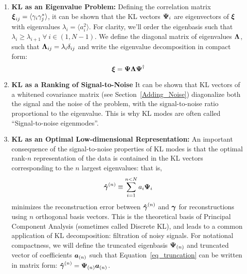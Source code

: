 \begin{enumerate}
\item \textbf{KL as an Eigenvalue Problem:} 
  Defining the correlation matrix 
  $\boldsymbol{\xi}_{ij} = \langle \gamma_i\gamma_j^*\rangle$, 
  it can be shown that the KL vectors $\boldsymbol{\Psi}_i$ are eigenvectors 
  of $\boldsymbol{\xi}$ with eigenvalues $\lambda_i = \langle a_i^2\rangle$.
  For clarity, we'll order the eigenbasis such that 
  $\lambda_i \ge \lambda_{i+1}\ \forall\ i\in(1,N-1)$.  We define the
  diagonal matrix of eigenvalues $\boldsymbol{\Lambda}$, such that
  $\boldsymbol{\Lambda}_{ij} = \lambda_i\delta_{ij}$
  and write the eigenvalue decomposition in compact form:
  \begin{equation}
    \boldsymbol{\xi} = \boldsymbol{\Psi}\boldsymbol{\Lambda}\boldsymbol{\Psi}^\dagger
  \end{equation}

\item \textbf{KL as a Ranking of Signal-to-Noise}
  It can be shown that KL vectors of a whitened covariance matrix (see
  Section~\ref{Adding_Noise})
  diagonalize both the signal and the noise of the problem, with the
  signal-to-noise ratio proportional to the eigenvalue.  This is
  why KL modes are often called ``Signal-to-noise eigenmodes''.

\item \textbf{KL as an Optimal Low-dimensional Representation:}
  An important consequence of the signal-to-noise properties of KL modes  
  is that the optimal rank-$n$ representation of the data is 
  contained in the KL vectors corresponding to the $n$ largest eigenvalues:
  that is,
  \begin{equation}
    \label{eq_truncation}
    \boldsymbol{\hat\gamma}^{(n)}
    \equiv \sum_{i=1}^{n<N} a_i\boldsymbol{\Psi}_i
  \end{equation}
  minimizes the reconstruction error between $\boldsymbol{\hat\gamma}^{(n)}$ and 
  $\boldsymbol{\gamma}$ for reconstructions using $n$ orthogonal basis vectors.
  This is the theoretical basis of Principal Component Analysis (sometimes
  called Discrete KL), and leads to a common application of KL 
  decomposition: filtration of noisy signals.  For notational compactness,
  we will define the truncated eigenbasis $\boldsymbol{\Psi}_{(n)}$ and truncated
  vector of coefficients $\boldsymbol{a}_{(n)}$ such that 
  Equation~\ref{eq_truncation} can be written in matrix form:
  $\boldsymbol{\hat\gamma}^{(n)} = \boldsymbol{\Psi}_{(n)}\boldsymbol{a}_{(n)}$.
\end{enumerate}
 
